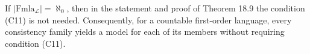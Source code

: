 \documentclass{article}
\begin{document}
If $|\text{Fmla}_\mathcal{L}| = \aleph_0$, then in the statement and proof of Theorem 18.9 the condition (C11) is not needed. Consequently, for a countable first-order language, every consistency family yields a model for each of its members without requiring condition (C11).
\end{document}
